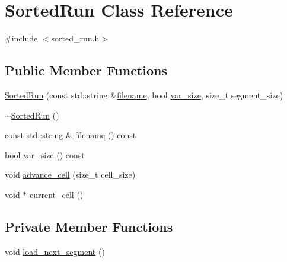 \hypertarget{classSortedRun}{}\section{Sorted\+Run Class Reference}
\label{classSortedRun}


{\ttfamily \#include $<$sorted\+\_\+run.\+h$>$}

\subsection*{Public Member Functions}
\begin{DoxyCompactItemize}
\item 
\hyperlink{classSortedRun_abb29f8bd7f2913135f89039124e68db2}{Sorted\+Run} (const std\+::string \&\hyperlink{classSortedRun_a044055e9fbf8e2b81007f4197f5cb8e2}{filename}, bool \hyperlink{classSortedRun_a898f4d70fae2ad5633539262c0254437}{var\+\_\+size}, size\+\_\+t segment\+\_\+size)
\item 
\hyperlink{classSortedRun_addf6d20f1f81f6bbf993fc9fea14cbd7}{$\sim$\+Sorted\+Run} ()
\item 
const std\+::string \& \hyperlink{classSortedRun_a044055e9fbf8e2b81007f4197f5cb8e2}{filename} () const 
\item 
bool \hyperlink{classSortedRun_a898f4d70fae2ad5633539262c0254437}{var\+\_\+size} () const 
\item 
void \hyperlink{classSortedRun_abdf11716e62d14557ea3c5177c13d6e3}{advance\+\_\+cell} (size\+\_\+t cell\+\_\+size)
\item 
void $\ast$ \hyperlink{classSortedRun_abf58213151ff25297b154f234eedb0b3}{current\+\_\+cell} ()
\end{DoxyCompactItemize}
\subsection*{Private Member Functions}
\begin{DoxyCompactItemize}
\item 
void \hyperlink{classSortedRun_a79ba2084f415cee514334549c0c873de}{load\+\_\+next\+\_\+segment} ()
\end{DoxyCompactItemize}
